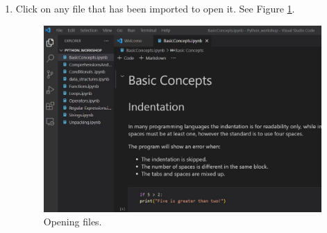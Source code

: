 \documentclass{assignment}
\begin{document}
\begin{enumerate}
{    }
    \item {
        Click on any file that has been imported to open it. See Figure \ref{fig:vsc_import_2}.
        \begin{figure}[h]
         \centering 
            \includegraphics[width=11cm]{assets/vs_code_opened_file.JPG}
            \caption{Opening files.}
            \label{fig:vsc_import_2}
        \end{figure}
    }
    
\end{enumerate}
\end{document}
